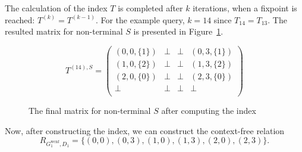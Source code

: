 The calculation of the index $T$ is completed after $k$ iterations, when a fixpoint is reached: $T^{(k)} = T^{(k-1)}$. For the example query, $k = 14$ since $T_{14} = T_{13}$. The resulted matrix for non-terminal $S$ is presented in Figure~\ref{ExampleQueryFinalMatrices}.

{\small
	\begin{figure}[h]
		\[
		T^{(14),S} = \begin{pmatrix}
			(0,0,\{1\}) & \bot       & \bot & (0,3,\{1\})       \\
			(1,0,\{2\}) & \bot & \bot       & (1,3,\{2\}) \\
			(2,0,\{0\})       & \bot & \bot & (2,3,\{0\}) \\
			\bot       & \bot & \bot & \bot \\
		\end{pmatrix}
		\]
		\caption{The final matrix for non-terminal $S$ after computing the index}
		\label{ExampleQueryFinalMatrices}
	\end{figure}
}

Now, after constructing the index, we can construct the context-free relation $$R_{G_1^{\text{wcnf}}, D_1}=\{(0,0),(0,3),(1,0),(1,3),(2,0),(2,3)\}.$$

